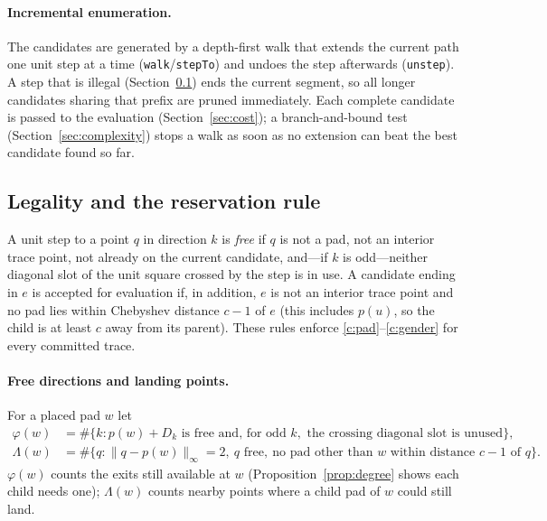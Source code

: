 \documentclass[11pt,a4paper]{article}
\theoremstyle{remark}
\newcommand{\pos}{p}
\newcommand{\cheb}[1]{\lVert #1 \rVert_\infty}
\newcommand{\freed}{\varphi}
\newcommand{\landpts}{\Lambda}
\begin{document}
\paragraph{Incremental enumeration.} The candidates are generated by a depth-first walk that extends the current
path one unit step at a time (\texttt{walk}/\texttt{stepTo}) and undoes the step afterwards (\texttt{unstep}).
A step that is illegal (Section~\ref{sec:legal}) ends the current segment, so all longer candidates sharing that
prefix are pruned immediately. Each complete candidate is passed to the evaluation (Section~\ref{sec:cost}); a
branch-and-bound test (Section~\ref{sec:complexity}) stops a walk as soon as no extension can beat the best
candidate found so far.

\subsection{Legality and the reservation rule}\label{sec:legal}

A unit step to a point $q$ in direction $k$ is \emph{free} if $q$ is not a pad, not an interior trace point, not
already on the current candidate, and---if $k$ is odd---neither diagonal slot of the unit square crossed by the step
is in use. A candidate ending in $e$ is accepted for evaluation if, in addition, $e$ is not an interior trace point
and no pad lies within Chebyshev distance $c-1$ of $e$ (this includes $\pos(u)$, so the child is at least $c$ away
from its parent). These rules enforce \ref{c:pad}--\ref{c:gender} for every committed trace.

\paragraph{Free directions and landing points.} For a placed pad $w$ let
\begin{align*}
\freed(w) &= \#\{k : \pos(w)+D_k \text{ is free and, for odd } k, \text{ the crossing diagonal slot is unused}\},\\
\landpts(w) &= \#\{q : \cheb{q-\pos(w)}=2,\ q \text{ free},\ \text{no pad other than } w \text{ within distance } c-1 \text{ of } q\}.
\end{align*}
$\freed(w)$ counts the exits still available at $w$ (Proposition~\ref{prop:degree} shows each child needs one);
$\landpts(w)$ counts nearby points where a child pad of $w$ could still land.
\end{document}
